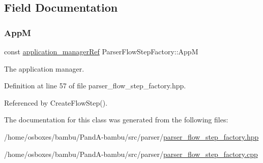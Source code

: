 \subsection{Field Documentation}
\mbox{\label{classParserFlowStepFactory_af7ef2990d585dcc365246ae9c5412979}} 
\subsubsection{\texorpdfstring{AppM}{AppM}}
{\footnotesize\ttfamily const \hyperlink{application__manager_8hpp_a04ccad4e5ee401e8934306672082c180}{application\+\_\+manager\+Ref} Parser\+Flow\+Step\+Factory\+::\+AppM\hspace{0.3cm}{\ttfamily [protected]}}



The application manager. 



Definition at line 57 of file parser\+\_\+flow\+\_\+step\+\_\+factory.\+hpp.



Referenced by Create\+Flow\+Step().



The documentation for this class was generated from the following files\+:\begin{DoxyCompactItemize}
\item 
/home/osboxes/bambu/\+Pand\+A-\/bambu/src/parser/\hyperlink{parser__flow__step__factory_8hpp}{parser\+\_\+flow\+\_\+step\+\_\+factory.\+hpp}\item 
/home/osboxes/bambu/\+Pand\+A-\/bambu/src/parser/\hyperlink{parser__flow__step__factory_8cpp}{parser\+\_\+flow\+\_\+step\+\_\+factory.\+cpp}\end{DoxyCompactItemize}

